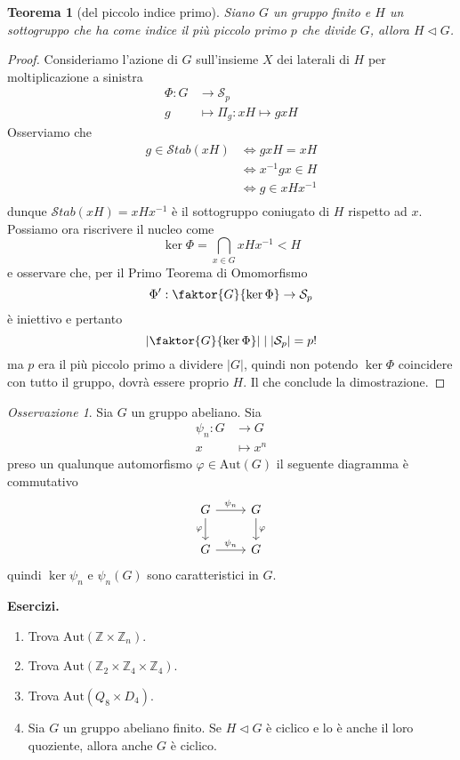 \documentclass[a4paper]{article}
\newtheorem{theorem}{Teorema}[section]
\theoremstyle{remark}
\newtheorem*{remark}{Osservazione}
\theoremstyle{definition}
\newcommand{\Aut}[1]{\mathrm{Aut}\left( #1 \right)}
\newcommand{\Stab}[1]{\mathcal{S}tab\left( #1 \right)}
\newcommand{\fun}[5]{\begin{align*}
	#1 \colon #2 &\to #3 \\
	#4 &\mapsto #5
	\end{align*}}
\begin{document}
\begin{multicols}{2}
	
\begin{theorem}[del piccolo indice primo]\label{ppp}
	Siano $ G $ un gruppo finito e $ H $ un sottogruppo che ha come indice il più piccolo primo $ p $ che divide $ G $, allora $ H \lhd G $.
\end{theorem}
\begin{proof}
	Consideriamo l'azione di $ G $ sull'insieme $ X $ dei laterali di $ H $ per moltiplicazione a sinistra \fun{\Phi}{G}{\mathcal{S}_p}{g}{\Pi_g : xH \mapsto gxH}
	Osserviamo che 
	\begin{align*}
		g \in \Stab{xH} &\Leftrightarrow gxH = xH \\
		&\Leftrightarrow x^{-1}gx \in H \\
		&\Leftrightarrow g \in xHx^{-1} \\
	\end{align*}
	dunque $ \Stab{xH} = xHx^{-1} $ è il sottogruppo coniugato di $ H $ rispetto ad $ x $. Possiamo ora riscrivere il nucleo come
	\[ \ker\Phi = \bigcap_{x \in G} xHx^{-1} < H \]
	e osservare che, per il Primo Teorema di Omomorfismo
	\[ \Phi ' : \faktor{G}{\ker\Phi} \rightarrow \mathcal{S}_p \]
	è iniettivo e pertanto
	\[ \left| \faktor{G}{\ker\Phi} \right| \mid |\mathcal{S}_p| = p! \]
	ma $ p $ era il più piccolo primo a dividere $ |G| $, quindi non potendo $ \ker\Phi $ coincidere con tutto il gruppo, dovrà essere proprio $ H $. Il che conclude la dimostrazione.
\end{proof}

\begin{remark}
	Sia $ G $ un gruppo abeliano. Sia \fun{\psi_n}{G}{G}{x}{x^n} preso un qualunque automorfismo $ \varphi \in \Aut{G} $ il seguente diagramma è commutativo
	\[ \begin{tikzcd}
	G \arrow{r}{\psi _n} \arrow[swap]{d}{\varphi} & G \arrow{d}{\varphi} \\
	G \arrow{r}{\psi _n} & G
	\end{tikzcd}
	\]
	quindi $ \ker\psi _n $ e $ \psi _n(G) $ sono caratteristici in $ G $. \\
	
\end{remark}
	
	\textbf{Esercizi.}
	\begin{enumerate}
		\item Trova $ \Aut{\mathbb{Z}\times\mathbb{Z}_n} $.
		\item Trova $ \Aut{\mathbb{Z}_2\times\mathbb{Z}_4\times\mathbb{Z}_4} $.
		\item Trova $ \Aut{Q_8 \times D_4} $.
		\item Sia $ G $ un gruppo abeliano finito. Se $ H \lhd G $ è ciclico e lo è anche il loro quoziente, allora anche $ G $ è ciclico.
	\end{enumerate}
\end{multicols}
\end{document}
